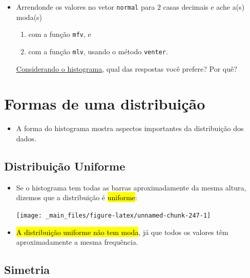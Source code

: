 \documentclass[
  11pt]{report}
\providecommand{\tightlist}{%
  \setlength{\itemsep}{0pt}\setlength{\parskip}{0pt}}
\begin{document}
\begin{itemize}
\item
  Arrendonde os valores no vetor \texttt{normal} para $2$ casas decimais e ache a(s) moda(s)

  \begin{enumerate}
  \def\labelenumi{\arabic{enumi}.}
  \item
    com a função \texttt{mfv}, e
  \item
    com a função \texttt{mlv}, usando o método \texttt{venter}.
  \end{enumerate}

  \protect\hyperlink{dados-normais}{Considerando o histograma}, qual das respostas você prefere? Por quê?
\end{itemize}

\hypertarget{formas-de-uma-distribuiuxe7uxe3o}{%
\section{Formas de uma distribuição}\label{formas-de-uma-distribuiuxe7uxe3o}}

\begin{itemize}
\tightlist
\item
  A forma do histograma mostra aspectos importantes da distribuição dos dados.
\end{itemize}

\hypertarget{distribuiuxe7uxe3o-uniforme}{%
\subsection{Distribuição Uniforme}\label{distribuiuxe7uxe3o-uniforme}}

\begin{itemize}
\item
  Se o histograma tem todas as barras aproximadamente da mesma altura, dizemos que a distribuição é {\hl{uniforme}}:

  \begin{center}\texttt{[image: \_main\_files/figure-latex/unnamed-chunk-247-1]} \end{center}
\item
  {\hl{A distribuição uniforme não tem moda}}, já que todos os valores têm aproximadamente a mesma frequência.
\end{itemize}

\hypertarget{simetria}{%
\subsection{Simetria}\label{simetria}}
\end{document}

